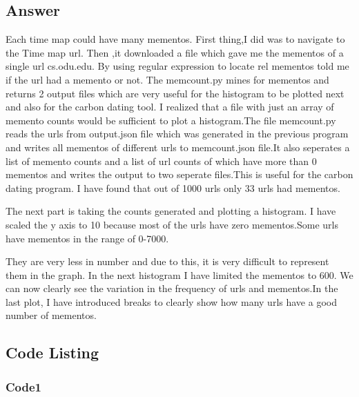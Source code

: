 \documentclass[letterpaper,11pt]{article}
\begin{document}
\subsection{Answer}
Each time map could have many mementos. First thing,I did was to navigate to the Time map url. Then ,it downloaded a file which gave me the mementos of a single url  cs.odu.edu. By using regular expression to locate rel mementos told me if the url had a memento or not.
The memcount.py mines for mementos and returns 2 output files which are very useful for the histogram to be plotted next and also for the carbon dating tool. 
I realized that a file with just an array of memento counts would be sufficient to plot a histogram.The file memcount.py reads the urls from output.json file which was generated in the previous program and writes all mementos of different urls to memcount.json file.It also seperates a list of memento counts and a list of url counts of  which have more than 0 mementos and writes the output to two seperate files.This is useful for the carbon dating program. I have found that out of 1000 urls only 33 urls had mementos.

The next part is taking the counts generated and plotting a histogram. I have scaled the y axis to 10 because most of the urls have zero mementos.Some urls have mementos in the range of 0-7000. 

They are very less in number and due to this, it is very difficult to represent them in the graph. In the next histogram I have limited the mementos to 600. We can now clearly see the variation in the frequency of urls and mementos.In the last plot, I have introduced breaks to clearly show how many urls have a good number of mementos.  


\newpage
\subsection{Code Listing}

\subsubsection{Code1}

\end{document}
